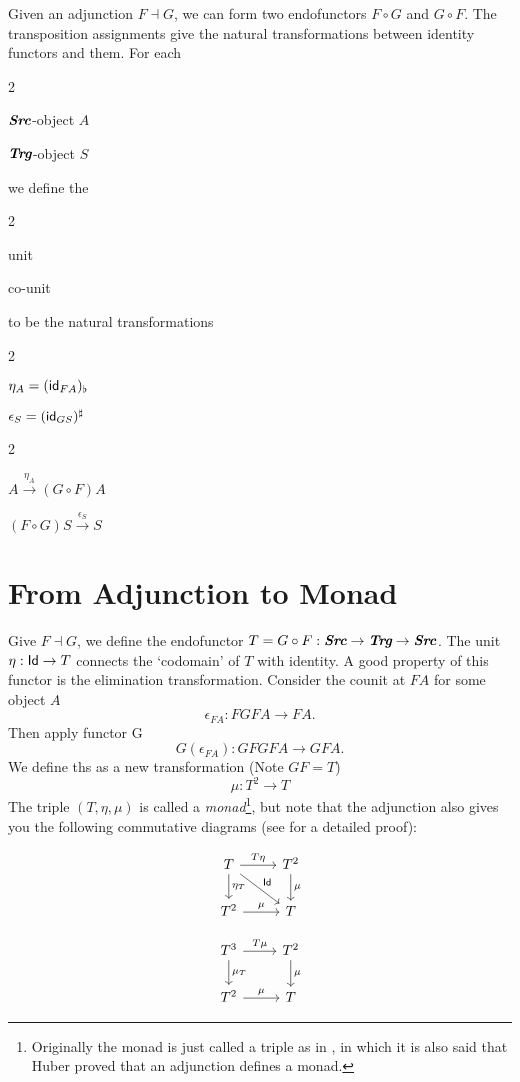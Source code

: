 \newcommand{\dual}[2]{
    \begin{multicols}{2}
        \begin{center}
            #1
        \end{center}
        \columnbreak 
        \begin{center}
            #2
        \end{center}
    \end{multicols}
}

\begin{definition}
    Given an adjunction $F\dashv G$, we can form two endofunctors
    $F\circ G$ and $G\circ F$. The transposition assignments give
    the natural transformations between identity functors and them.
    For each
    \dual{$\textbf{\em Src}$-object $A$}{$\textbf{\em Trg}$-object $S$}
    we define the
    \dual{\sf unit}{\sf co-unit}
    to be the natural transformations
    \dual{$\eta_A=(\text{\sf id}_{FA})_\flat$}{$\epsilon_S=(\text{\sf id}_{GS})^\sharp$}
    \dual{$A\overset{\eta_A}\longrightarrow(G\circ F)A$}
        {$(F\circ G)S\overset{\epsilon_S}\longrightarrow S$}  
\end{definition}

\section{From Adjunction to Monad}
Give $F\dashv G$, we define the endofunctor $T=G\circ F:\textbf{\em Src}\to\textbf{\em Trg}\to\textbf{\em Src}$.
The unit $\eta:\text{\sf Id}\to T$ connects the `codomain' of $T$ with identity.
A good property of this functor is the elimination transformation.
Consider the counit at $FA$ for some object $A$
$$
    \epsilon_{FA}:FGFA\to FA.
$$
Then apply functor G
$$
    G(\epsilon_{FA}):GFGFA\to GFA.
$$
We define ths as a new transformation (Note $GF=T$)
$$
    \mu:T^2\to T
$$
The triple $(T,\eta,\mu)$ is called a {\it monad}\footnote{
Originally the monad is just called a triple as in 
\cite{Introduction-to-higher-order-categorical-logic}, in which it is
also said that Huber proved that an adjunction defines a monad. },
but note that the adjunction also gives you the following commutative diagrams (see \cite{cat-awodey} for a detailed proof): 

$$
\begin{tikzcd}
    T \arrow{r}{T\eta} \arrow{d}{\eta_T} \arrow{rd}{\Id} & T^2
    \arrow{d}{\mu} \\
    T^2 \arrow{r}{\mu} & T
\end{tikzcd}
$$

$$
\begin{tikzcd}
    T^3 \arrow{r}{T\mu} \arrow{d}{\mu_T} & T^2
    \arrow{d}{\mu} \\
    T^2 \arrow{r}{\mu} & T
\end{tikzcd}
$$


